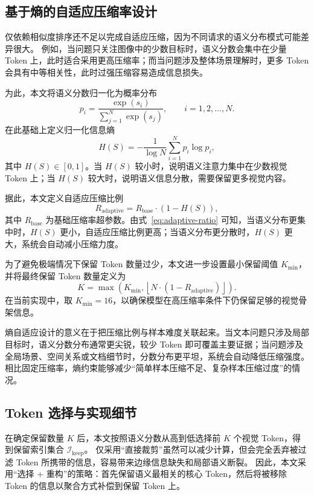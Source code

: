 \subsection{基于熵的自适应压缩率设计}
仅依赖相似度排序还不足以完成自适应压缩，因为不同请求的语义分布模式可能差异很大。
例如，当问题只关注图像中的少数目标时，语义分数会集中在少量 Token 上，此时适合采用更高压缩率；而当问题涉及整体场景理解时，更多 Token 会具有中等相关性，此时过强压缩容易造成信息损失。

为此，本文将语义分数归一化为概率分布
\begin{equation}
p_i = \frac{\exp(s_i)}{\sum_{j=1}^{N}\exp(s_j)}, \qquad i = 1,2,\ldots,N.
\label{eq:softmax}
\end{equation}
在此基础上定义归一化信息熵
\begin{equation}
H(S) = -\frac{1}{\log N} \sum_{i=1}^{N} p_i \log p_i,
\label{eq:entropy}
\end{equation}
其中 $H(S) \in [0,1]$。当 $H(S)$ 较小时，说明语义注意力集中在少数视觉 Token 上；当 $H(S)$ 较大时，说明语义信息分散，需要保留更多视觉内容。

据此，本文定义自适应压缩比例
\begin{equation}
R_{\mathrm{adaptive}} = R_{\mathrm{base}} \cdot \left(1 - H(S)\right),
\label{eq:adaptive-ratio}
\end{equation}
其中 $R_{\mathrm{base}}$ 为基础压缩率超参数。由式~\eqref{eq:adaptive-ratio} 可知，当语义分布更集中时，$H(S)$ 更小，自适应压缩比例更高；当语义分布更分散时，$H(S)$ 更大，系统会自动减小压缩力度。

为了避免极端情况下保留 Token 数量过少，本文进一步设置最小保留阈值 $K_{\min}$，并将最终保留 Token 数量定义为
\begin{equation}
K = \max \left( K_{\min}, \left\lfloor N \cdot \left(1 - R_{\mathrm{adaptive}}\right) \right\rfloor \right).
\label{eq:keep-num}
\end{equation}
在当前实现中，取 $K_{\min}=16$，以确保模型在高压缩率条件下仍保留足够的视觉骨架信息。

熵自适应设计的意义在于把压缩比例与样本难度关联起来。当文本问题只涉及局部目标时，语义分数分布通常更尖锐，较少 Token 即可覆盖主要证据；当问题涉及全局场景、空间关系或文档细节时，分数分布更平坦，系统会自动降低压缩强度。相比固定压缩率，熵约束能够减少“简单样本压缩不足、复杂样本压缩过度”的情况。

\subsection{Token 选择与实现细节}
在确定保留数量 $K$ 后，本文按照语义分数从高到低选择前 $K$ 个视觉 Token，得到保留索引集合 $\mathcal{I}_{\mathrm{keep}}$。
仅采用“直接裁剪”虽然可以减少计算，但会完全丢弃被过滤 Token 所携带的信息，容易带来边缘信息缺失和局部语义断裂。
因此，本文采用“选择 + 重构”的策略：首先保留语义最相关的核心 Token，然后将被移除 Token 的信息以聚合方式补偿到保留 Token 上。


